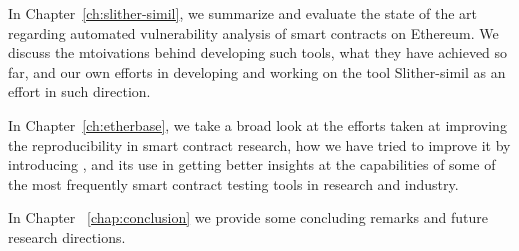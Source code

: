   In Chapter~\ref{ch:slither-simil}, we summarize and evaluate the state of the art regarding automated vulnerability analysis of smart contracts on Ethereum. We discuss the mtoivations behind developing such tools, what they have achieved so far, and our own efforts in developing and working on the tool Slither-simil as an effort in such direction.

  In Chapter~\ref{ch:etherbase}, we take a broad look at the efforts taken at improving the reproducibility in smart contract research, how we have tried to improve it by introducing \mytool, and its use in getting better insights at the capabilities of some of the most frequently smart contract testing tools in research and industry.

  In Chapter ~\ref{chap:conclusion} we provide some concluding remarks and future research directions.